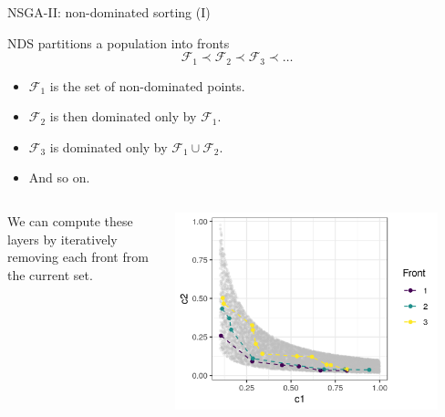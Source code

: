 \documentclass[11pt,compress,t,notes=noshow,xcolor=table]{beamer}
\begin{document}
\begin{vbframe}{NSGA-II: non-dominated sorting (I)}

NDS partitions a population into fronts 
\[
  \mathcal{F}_1 \prec \mathcal{F}_2 \prec \mathcal{F}_3 \prec \dots
\]
\begin{itemize}
\item $\mathcal{F}_1$ is the set of non-dominated points.
\item $\mathcal{F}_2$ is then dominated only by $\mathcal{F}_1$.
\item $\mathcal{F}_3$ is dominated only by $\mathcal{F}_1 \cup \mathcal{F}_2$.
\item And so on.
\end{itemize}

\begin{columns}
\begin{column}{0.4\textwidth}
We can compute these layers by iteratively removing each front from the current set.
\end{column}

\begin{column}{0.6\textwidth}
\begin{center}
\includegraphics[width=0.9\textwidth]{slides/11-multicrit/figure_man/NSGA2_NDS.png}
\end{center}
\end{column}
\end{columns}

\end{vbframe}
\end{document}
